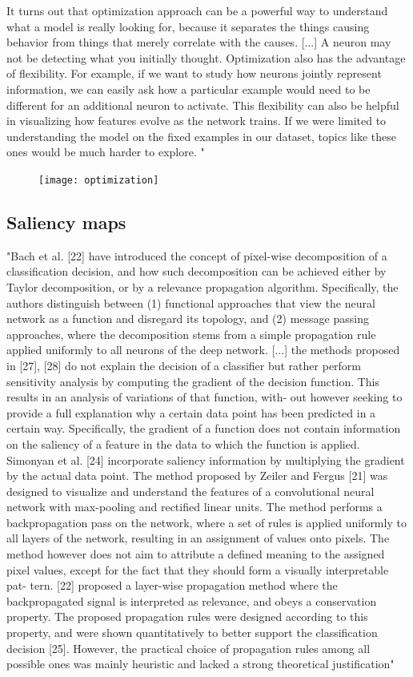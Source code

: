 		It turns out that optimization approach can be a powerful way to understand what a model is really looking for, because it separates the things causing behavior from things that merely correlate with the causes. [...] A neuron may not be detecting what you initially thought. Optimization also has the advantage of ﬂexibility. For example, if we want to study how neurons jointly represent information, we can easily ask how a particular example would need to be different for an additional neuron to activate. This ﬂexibility can also be helpful in visualizing how features evolve as the network trains. If we were limited to understanding the model on the ﬁxed examples in our dataset, topics like these ones would be much harder to explore. " \cite{Olah2017}
		\begin{figure}[h]
			\centering
			\texttt{[image: optimization]}
		\end{figure}
	
	\subsection{Saliency maps}
	"Bach et al. [22] have introduced the concept of pixel-wise decomposition of a classification decision, and how such decomposition can be achieved either by Taylor decomposition, or by a relevance propagation algorithm. Specifically, the authors distinguish between (1) functional approaches that view the neural network as a function and disregard its topology, and (2) message passing approaches, where the decomposition stems from a simple propagation rule applied uniformly to all neurons of the deep network.
	[...]
	the methods proposed in [27], [28] do not explain the decision of a classifier but rather perform sensitivity analysis by computing the gradient of the decision function. This results in an analysis of variations of that function, with- out however seeking to provide a full explanation why a certain data point has been predicted in a certain way. Specifically, the gradient of a function does not contain information on the saliency of a feature in the data to which the function is applied. Simonyan et al. [24] incorporate saliency information by multiplying the gradient by the actual data point.
	The method proposed by Zeiler and Fergus [21] was designed to visualize and understand the features of a convolutional neural network with max-pooling and rectified linear units. The method performs a backpropagation pass on the network, where a set of rules is applied uniformly to all layers of the network, resulting in an assignment of values onto pixels. The method however does not aim to attribute a defined meaning to the assigned pixel values, except for the fact that they should form a visually interpretable pat- tern. [22] proposed a layer-wise propagation method where the backpropagated signal is interpreted as relevance, and obeys a conservation property. The proposed propagation rules were designed according to this property, and were shown quantitatively to better support the classification decision [25]. However, the practical choice of propagation rules among all possible ones was mainly heuristic and lacked a strong theoretical justification" \cite{Montavon2017}
	
